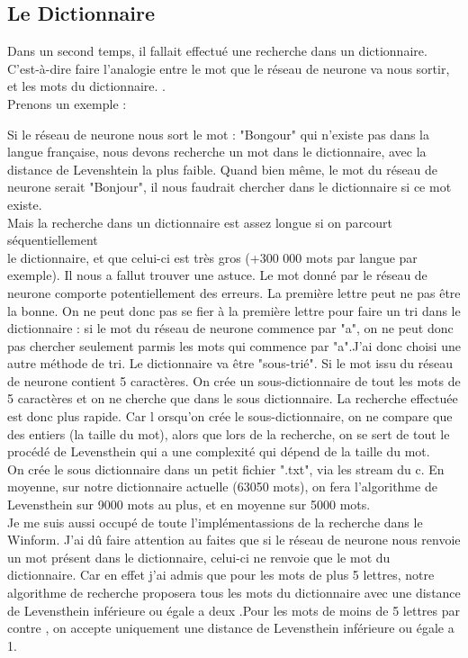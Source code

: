 \documentclass{article}
\begin{document}
                \subsection{Le Dictionnaire}
Dans un second temps, il fallait effectué une recherche dans un dictionnaire. C’est-à-dire faire l’analogie entre le mot que le réseau de neurone va nous sortir, et les mots du dictionnaire. . \\
Prenons un exemple :

Si le réseau de neurone nous sort le mot : "Bongour" qui n’existe pas dans la langue française, nous devons recherche un mot dans le dictionnaire, avec la distance de Levenshtein la plus faible.
Quand bien même, le mot du réseau de neurone serait "Bonjour", il nous faudrait chercher
dans le dictionnaire si ce mot existe.\\
Mais la recherche dans un dictionnaire est assez longue si on parcourt séquentiellement\\
le dictionnaire, et que celui-ci est très gros (+300 000 mots par langue par exemple). Il nous a fallut trouver une astuce. Le mot donné par le réseau de neurone comporte potentiellement des erreurs. La première lettre peut ne pas être la bonne. On ne peut donc pas se fier à la première lettre pour faire un tri dans le dictionnaire : si le mot du réseau de neurone commence par "a", on ne peut donc pas chercher seulement parmis les mots qui commence par "a".J’ai donc choisi une autre méthode de tri. Le dictionnaire va être "sous-trié". Si le mot issu du réseau de neurone contient 5 caractères. On crée un sous-dictionnaire de tout les mots de 5 caractères et on ne cherche que dans le sous dictionnaire. La recherche effectuée est donc plus rapide. Car l orsqu’on crée le sous-dictionnaire, on ne compare que des entiers (la taille du mot), alors que lors de la recherche, on se sert de tout le procédé de Levensthein qui a une complexité qui dépend de la taille du mot.\\
On crée le sous dictionnaire dans un petit fichier ".txt", via les stream du c. En moyenne, sur notre dictionnaire actuelle (63050 mots), on fera l’algorithme de Levensthein sur 9000 mots au plus, et en moyenne sur 5000 mots. \\
Je me suis aussi occupé de toute l’implémentassions de la recherche dans le Winform. J'ai dû faire attention au faites que si le réseau de neurone nous renvoie un mot présent dans le dictionnaire, celui-ci ne renvoie que le mot du dictionnaire. Car en effet j'ai admis que pour les mots de plus 5 lettres, notre algorithme de recherche proposera tous les mots du dictionnaire avec une distance de Levensthein inférieure ou égale a deux .Pour les mots de moins de 5 lettres par contre , on accepte uniquement une distance de Levensthein inférieure ou égale a 1.\\
\end{document}
